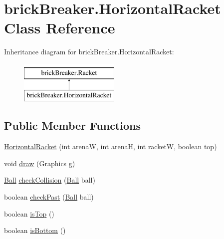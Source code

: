 \hypertarget{classbrick_breaker_1_1_horizontal_racket}{
\section{brickBreaker.HorizontalRacket Class Reference}
\label{classbrick_breaker_1_1_horizontal_racket}
}
Inheritance diagram for brickBreaker.HorizontalRacket:\begin{figure}[H]
\begin{center}
\leavevmode
\includegraphics[height=2cm]{classbrick_breaker_1_1_horizontal_racket}
\end{center}
\end{figure}
\subsection*{Public Member Functions}
\begin{DoxyCompactItemize}
\item 
\hyperlink{classbrick_breaker_1_1_horizontal_racket_aecf9f4abdeda94cc4477603aec0d3640}{HorizontalRacket} (int arenaW, int arenaH, int racketW, boolean top)
\item 
void \hyperlink{classbrick_breaker_1_1_horizontal_racket_a8d97c411da71162acd5ecbb32c333f8d}{draw} (Graphics g)
\item 
\hyperlink{classbrick_breaker_1_1_ball}{Ball} \hyperlink{classbrick_breaker_1_1_horizontal_racket_a0a504cfa7af83740b19435e73ecd7975}{checkCollision} (\hyperlink{classbrick_breaker_1_1_ball}{Ball} ball)
\item 
boolean \hyperlink{classbrick_breaker_1_1_horizontal_racket_a183d1d47f35fad74e603534ec74fbdb9}{checkPast} (\hyperlink{classbrick_breaker_1_1_ball}{Ball} ball)
\item 
boolean \hyperlink{classbrick_breaker_1_1_horizontal_racket_a12688619999a3e4d302449ab4bcd0e3d}{isTop} ()
\item 
boolean \hyperlink{classbrick_breaker_1_1_horizontal_racket_aef823257f470172eb2caacfa95a61b99}{isBottom} ()
\end{DoxyCompactItemize}


